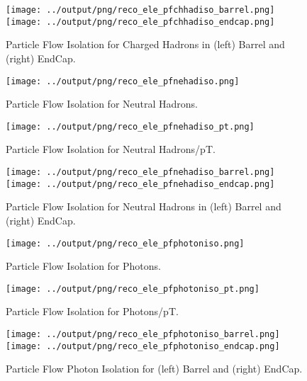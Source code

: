 \documentclass[11pt]{book}
\begin{document}
\begin{figure}[ht]
\centering
\texttt{[image: ../output/png/reco\_ele\_pfchhadiso\_barrel.png]}
\texttt{[image: ../output/png/reco\_ele\_pfchhadiso\_endcap.png]}
\caption{Particle Flow Isolation for Charged Hadrons in (left) Barrel and (right) EndCap.}
\label{fig:reco_ele_pfchhadiso_regions}
\end{figure}

\begin{figure}[ht]
\centering
\texttt{[image: ../output/png/reco\_ele\_pfnehadiso.png]}
\caption{Particle Flow Isolation for Neutral Hadrons.}
\label{fig:reco_ele_pfnehadiso}
\end{figure}

\begin{figure}[htb]
\centering
\texttt{[image: ../output/png/reco\_ele\_pfnehadiso\_pt.png]}
\caption{Particle Flow Isolation for Neutral Hadrons/pT.}
\label{fig:reco_ele_pfnehadiso_pt}
\end{figure}


\begin{figure}[ht]
\centering
\texttt{[image: ../output/png/reco\_ele\_pfnehadiso\_barrel.png]}
\texttt{[image: ../output/png/reco\_ele\_pfnehadiso\_endcap.png]}
\caption{Particle Flow Isolation for Neutral Hadrons in (left) Barrel and (right) EndCap.}
\label{fig:reco_ele_pfnehadiso_regions}
\end{figure}

\begin{figure}[ht]
\centering
\texttt{[image: ../output/png/reco\_ele\_pfphotoniso.png]}
\caption{Particle Flow Isolation for Photons.}
\label{fig:reco_ele_pfphotoniso}
\end{figure}

\begin{figure}[ht]
\centering
\texttt{[image: ../output/png/reco\_ele\_pfphotoniso\_pt.png]}
\caption{Particle Flow Isolation for Photons/pT.}
\label{fig:reco_ele_pfphotoniso_pt}
\end{figure}

\begin{figure}[ht]
\centering
\texttt{[image: ../output/png/reco\_ele\_pfphotoniso\_barrel.png]}
\texttt{[image: ../output/png/reco\_ele\_pfphotoniso\_endcap.png]}
\caption{Particle Flow Photon Isolation for (left) Barrel and (right) EndCap.}
\label{fig:reco_ele_pfphotoniso_regions}
\end{figure}
\clearpage
\end{document}
